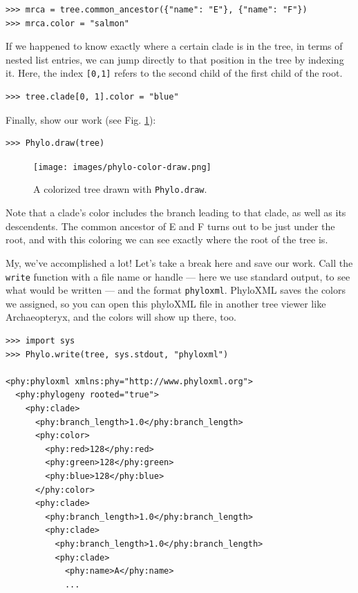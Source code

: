\documentclass{report}
\begin{document}
\begin{verbatim}
>>> mrca = tree.common_ancestor({"name": "E"}, {"name": "F"})
>>> mrca.color = "salmon"
\end{verbatim}

If we happened to know exactly where a certain clade is in the tree, in terms of nested list
entries, we can jump directly to that position in the tree by indexing it.  Here, the index
\verb|[0,1]| refers to the second child of the first child of the root.

\begin{verbatim}
>>> tree.clade[0, 1].color = "blue"
\end{verbatim}

Finally, show our work (see Fig. \ref{fig:phylo-color-draw}):

\begin{verbatim}
>>> Phylo.draw(tree)
\end{verbatim}

\begin{htmlonly}
\label{fig:phylo-color-draw}
\end{htmlonly}

\begin{latexonly}
\begin{figure}[htb]
\centering
\texttt{[image: images/phylo-color-draw.png]}
\caption{A colorized tree drawn with {\tt Phylo.draw}.}
\label{fig:phylo-color-draw}
\end{figure}
\end{latexonly}

Note that a clade's color includes the branch leading to that clade, as well as its
descendents. The common ancestor of E and F turns out to be just under the root, and with this
coloring we can see exactly where the root of the tree is.

My, we've accomplished a lot! Let's take a break here and save our work.  Call the
\texttt{write} function with a file name or handle --- here we use standard output, to see what
would be written --- and the format \texttt{phyloxml}.  PhyloXML saves the colors we assigned,
so you can open this phyloXML file in another tree viewer like Archaeopteryx, and the colors
will show up there, too.

\begin{verbatim}
>>> import sys
>>> Phylo.write(tree, sys.stdout, "phyloxml")

<phy:phyloxml xmlns:phy="http://www.phyloxml.org">
  <phy:phylogeny rooted="true">
    <phy:clade>
      <phy:branch_length>1.0</phy:branch_length>
      <phy:color>
        <phy:red>128</phy:red>
        <phy:green>128</phy:green>
        <phy:blue>128</phy:blue>
      </phy:color>
      <phy:clade>
        <phy:branch_length>1.0</phy:branch_length>
        <phy:clade>
          <phy:branch_length>1.0</phy:branch_length>
          <phy:clade>
            <phy:name>A</phy:name>
            ...
\end{verbatim}
\end{document}
